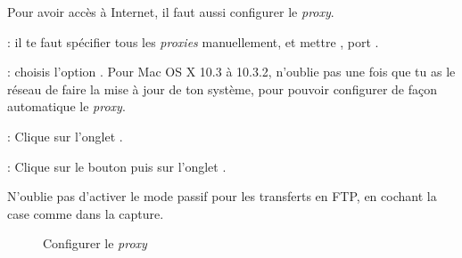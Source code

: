   

Pour avoir accès à Internet, il faut aussi configurer le \emph{proxy}.

 : il te faut spécifier tous les
\emph{proxies} manuellement, et mettre , port .

 :  choisis l'option . Pour Mac OS X 10.3 à 10.3.2, n'oublie pas une fois que tu as le réseau de faire la mise à jour de ton système, pour pouvoir configurer de façon automatique le \emph{proxy}.

 : Clique sur l'onglet .

 : Clique sur le bouton  puis sur l'onglet .

N'oublie pas d'activer le mode passif pour les transferts en FTP, en cochant la case comme dans la capture.


  \begin{figure}[!hl]
    \begin{center}
      \hspace{0.1 \textwidth}
      \caption{Configurer le \emph{proxy}}
    \end{center}
  \end{figure}
  
